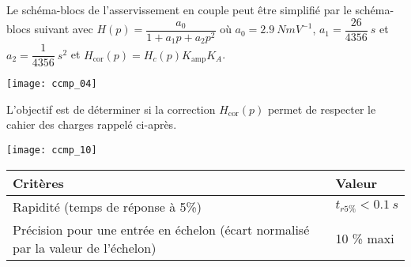 Le schéma-blocs de l'asservissement en couple peut être simplifié par le schéma-blocs suivant avec 
$H( p)=\dfrac{a_0}{1+a_1 p+a_2 p^2}$ où 
$a_0=\SI{2,9}{NmV^{-1}}$, 
$a_1=\dfrac{26}{4356}\SI{}{s}$ et $a_2=\dfrac{1}{4356}\SI{}{s^2}$ et $H_{\text{cor}}( p)=H_c (p)K_{\text{amp}}K_A$.
\begin{marginfigure}
\texttt{[image: ccmp\_04]}

\end{marginfigure}



\begin{obj}
L'objectif est de déterminer si la correction  $H_{\text{cor}}( p)$ permet de respecter le cahier des charges
rappelé ci-après.
\end{obj}

\ifprof
\else
\begin{marginfigure}
\texttt{[image: ccmp\_10]}
\end{marginfigure}
\fi

\begin{center}
\begin{tabular}{p{8cm}l}
\hline
Critères & Valeur \\ \hline
Rapidité (temps de réponse à 5\%) & $t_{r5\%}<\SI{0,1}{s}$ \\ 
Précision pour une entrée en échelon
(écart normalisé par la valeur de l'échelon) & 10 \% maxi \\
\hline
\end{tabular}
\end{center}

